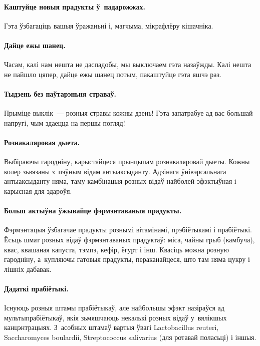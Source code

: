\paragraph{Каштуйце новыя прадукты ў~падарожжах.}
Гэта ўзбагаціць вашыя ўражаньні і, магчыма, мікрафлёру кішачніка.

\paragraph{Дайце ежы шанец.}
Часам, калі нам нешта не даспадобы, мы выключаем гэта назаўжды. Калі нешта не пайшло цяпер, дайце ежы шанец потым, пакаштуйце гэта яшчэ раз.

\paragraph{Тыдзень без паўтарэньня страваў.}
Прыміце выклік~--- розныя стравы кожны дзень! Гэта запатрабуе ад вас большай напругі, чым здаецца на першы погляд!

\paragraph{Рознакаляровая дыета.}
Выбіраючы гародніну, карыстайцеся прынцыпам рознакаляровай дыеты. Кожны колер зьвязаны з~пэўным відам антыаксыданту. Адзінага ўнівэрсальнага антыаксыданту няма, таму камбінацыя розных відаў найболей эфэктыўная і карысная для здароўя.

\paragraph{Больш актыўна ўжывайце фэрмэнтаваныя прадукты.}
Фэрмэнтацыя ўзбагачае прадукты рознымі вітамінамі, прэбіётыкамі і прабіётыкі. Ёсьць шмат розных відаў фэрмэнтаваных прадуктаў: міса, чайны грыб (камбуча), квас, квашаная капуста, тэмпэ, кефір, ёгурт і інш. Квасіць можна розную гародніну, а~купляючы гатовыя прадукты, пераканайцеся, што там няма цукру і лішніх дабавак.

\paragraph{Дадаткі прабіётыкі.}
Існуюць розныя штамы прабіётыкаў, але найбольшы эфэкт назіраўся ад мультыпрабіётыкаў, якія зьмяшчаюць некалькі розных відаў у~вялікшых канцэнтрацыях. З~асобных штамаў вартыя ўвагі Lactobacillus reuteri, Saccharomyces boulardii, Streptococcus salivarius (для ротавай поласьці) і іншыя.

